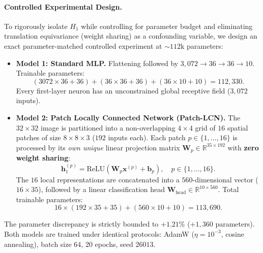 \paragraph{Controlled Experimental Design.}
To rigorously isolate $H_1$ while controlling for parameter budget and eliminating translation equivariance (weight sharing) as a confounding variable, we design an exact parameter-matched controlled experiment at $\sim 112\text{k}$ parameters:
\begin{itemize}
    \item \textbf{Model 1: Standard MLP.} Flattening followed by $3{,}072 \to 36 \to 36 \to 10$. Trainable parameters:
    \begin{equation}
        (3072 \times 36 + 36) + (36 \times 36 + 36) + (36 \times 10 + 10) = 112{,}330.
    \end{equation}
    Every first-layer neuron has an unconstrained global receptive field ($3{,}072$ inputs).
    \item \textbf{Model 2: Patch Locally Connected Network (Patch-LCN).} The $32 \times 32$ image is partitioned into a non-overlapping $4 \times 4$ grid of $16$ spatial patches of size $8 \times 8 \times 3$ ($192$ inputs each). Each patch $p \in \{1, \dots, 16\}$ is processed by its \textit{own unique} linear projection matrix $\mathbf{W}_p \in \mathbb{R}^{35 \times 192}$ with \textbf{zero weight sharing}:
    \begin{equation}
        \mathbf{h}_1^{(p)} = \text{ReLU}(\mathbf{W}_p \mathbf{x}^{(p)} + \mathbf{b}_p), \quad p \in \{1, \dots, 16\}.
    \end{equation}
    The $16$ local representations are concatenated into a $560$-dimensional vector ($16 \times 35$), followed by a linear classification head $\mathbf{W}_{\text{head}} \in \mathbb{R}^{10 \times 560}$. Total trainable parameters:
    \begin{equation}
        16 \times (192 \times 35 + 35) + (560 \times 10 + 10) = 113{,}690.
    \end{equation}
\end{itemize}
The parameter discrepancy is strictly bounded to $+1.21\%$ ($+1{,}360$ parameters). Both models are trained under identical protocols: AdamW ($\eta=10^{-3}$, cosine annealing), batch size $64$, $20$ epochs, seed $26013$.

